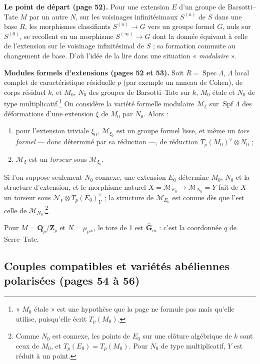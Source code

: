 \documentclass[11pt,a4paper]{article}
\begin{document}
\textbf{Le point de départ (page 52).} Pour une extension $E$ d'un groupe de
Barsotti--Tate $M$ par un autre $N$, sur les voisinages infinitésimaux
$S^{(n)}$ de $S$ dans une base $R$, les morphismes classifiants
$S^{(n)} \to G$ vers un groupe formel $G$, nuls sur $S^{(0)}$, se recollent en
un morphisme $S^{(\infty)} \to G$ dont la donnée équivaut à celle de
l'extension sur le voisinage infinitésimal de $S$ ; sa formation commute au
changement de base. D'où l'idée de la lire dans une situation
« \emph{modulaire} ».

\textbf{Modules formels d'extensions (pages 52 et 53).} Soit
$R = \operatorname{Spec}\Lambda$, $\Lambda$ local complet de caractéristique
résiduelle $p$ (par exemple un anneau de Cohen), de corps résiduel $k$, et
$M_0$, $N_0$ des groupes de Barsotti--Tate sur $k$, $M_0$ étale et $N_0$ de type
multiplicatif.\footnote{« $M_0$ étale » est une hypothèse que la page ne
formule pas mais qu'elle utilise, puisqu'elle écrit $T_p(M_0)$.} On considère
la variété formelle modulaire $\mathcal{M}_\xi$ sur $\operatorname{Spf}\Lambda$
des déformations d'une extension $\xi$ de $M_0$ par $N_0$. Alors :
\begin{enumerate}
\item pour l'extension triviale $\xi_0$, $\mathcal{M}_{\xi_0}$ est un groupe
formel lisse, et même un \emph{tore formel} — donc déterminé par sa réduction —,
de réduction $T_p(M_0)^\vee \otimes N_0$ ;
\item $\mathcal{M}_\xi$ est un \emph{torseur} sous $\mathcal{M}_{\xi_0}$.
\end{enumerate}
Si l'on suppose seulement $N_0$ connexe, une extension $E_0$ détermine $M_0$,
$N_0$ et la structure d'extension, et le morphisme naturel
$X = \mathcal{M}_{E_0} \to \mathcal{M}_{N_0} = Y$ fait de $X$ un torseur sous
$\mathcal{N}_Y \otimes T_p(E_0)^\vee_Y$ ; la structure de
$\mathcal{M}_{E_0}$ est connue dès que l'est celle de
$\mathcal{M}_{N_0}$.\footnote{Comme $N_0$ est connexe, les points de $E_0$ sur
une clôture algébrique de $k$ sont ceux de $M_0$, et $T_p(E_0) = T_p(M_0)$. Pour
$N_0$ de type multiplicatif, $Y$ est réduit à un point.}

Pour $M = \mathbf{Q}_p/\mathbf{Z}_p$ et $N = \mu_{p^\infty}$, le tore de 1 est
$\widehat{\mathbf{G}}_m$ : c'est la coordonnée $q$ de Serre--Tate.

\subsection*{Couples compatibles et variétés abéliennes polarisées (pages 54 à 56)}
\end{document}
